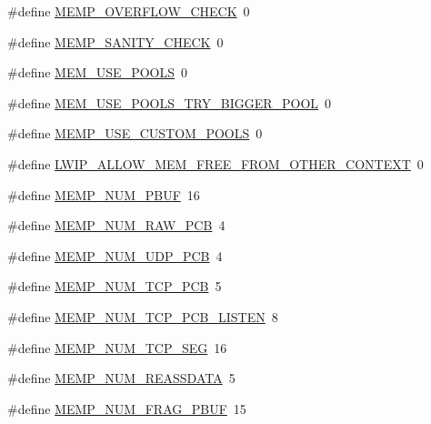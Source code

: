 \begin{DoxyCompactItemize}
\item 
\#define \hyperlink{group__lwip__opts__mem_ga27fdd01194a42fc41a7716b72cdb49e3}{M\+E\+M\+P\+\_\+\+O\+V\+E\+R\+F\+L\+O\+W\+\_\+\+C\+H\+E\+CK}~0
\item 
\#define \hyperlink{group__lwip__opts__mem_ga0838947193e222a9f46b582e01e5beff}{M\+E\+M\+P\+\_\+\+S\+A\+N\+I\+T\+Y\+\_\+\+C\+H\+E\+CK}~0
\item 
\#define \hyperlink{group__lwip__opts__mem_gaddca3141bc7037241769eb152b6f89ba}{M\+E\+M\+\_\+\+U\+S\+E\+\_\+\+P\+O\+O\+LS}~0
\item 
\#define \hyperlink{group__lwip__opts__mem_gaba8be68e8fd0716b723ce4569ed89f82}{M\+E\+M\+\_\+\+U\+S\+E\+\_\+\+P\+O\+O\+L\+S\+\_\+\+T\+R\+Y\+\_\+\+B\+I\+G\+G\+E\+R\+\_\+\+P\+O\+OL}~0
\item 
\#define \hyperlink{group__lwip__opts__mem_ga69de593b8ffd4f1c249f03e48e11983b}{M\+E\+M\+P\+\_\+\+U\+S\+E\+\_\+\+C\+U\+S\+T\+O\+M\+\_\+\+P\+O\+O\+LS}~0
\item 
\#define \hyperlink{group__lwip__opts__mem_ga0a3ef6098813c103e5aba07da76e15e2}{L\+W\+I\+P\+\_\+\+A\+L\+L\+O\+W\+\_\+\+M\+E\+M\+\_\+\+F\+R\+E\+E\+\_\+\+F\+R\+O\+M\+\_\+\+O\+T\+H\+E\+R\+\_\+\+C\+O\+N\+T\+E\+XT}~0
\item 
\#define \hyperlink{group__lwip__opts__memp_ga92b30aed958ec59334d936d4ca725418}{M\+E\+M\+P\+\_\+\+N\+U\+M\+\_\+\+P\+B\+UF}~16
\item 
\#define \hyperlink{group__lwip__opts__memp_ga379bf92ed322cda54cb701337421e0d3}{M\+E\+M\+P\+\_\+\+N\+U\+M\+\_\+\+R\+A\+W\+\_\+\+P\+CB}~4
\item 
\#define \hyperlink{group__lwip__opts__memp_ga2c416da481ab09bd1ba257b75a0707eb}{M\+E\+M\+P\+\_\+\+N\+U\+M\+\_\+\+U\+D\+P\+\_\+\+P\+CB}~4
\item 
\#define \hyperlink{group__lwip__opts__memp_ga73beecc19cfbc3114768f9b32b2cd70e}{M\+E\+M\+P\+\_\+\+N\+U\+M\+\_\+\+T\+C\+P\+\_\+\+P\+CB}~5
\item 
\#define \hyperlink{group__lwip__opts__memp_ga04fba6a249123513271dccb4ec26aa5a}{M\+E\+M\+P\+\_\+\+N\+U\+M\+\_\+\+T\+C\+P\+\_\+\+P\+C\+B\+\_\+\+L\+I\+S\+T\+EN}~8
\item 
\#define \hyperlink{group__lwip__opts__memp_gaa35fb3a1a76661e3ffb9722a57092de3}{M\+E\+M\+P\+\_\+\+N\+U\+M\+\_\+\+T\+C\+P\+\_\+\+S\+EG}~16
\item 
\#define \hyperlink{group__lwip__opts__memp_ga169436c5860253b90e25bdba9fdcac86}{M\+E\+M\+P\+\_\+\+N\+U\+M\+\_\+\+R\+E\+A\+S\+S\+D\+A\+TA}~5
\item 
\#define \hyperlink{group__lwip__opts__memp_ga1f66051a654dcd7a4e19bc6aff240630}{M\+E\+M\+P\+\_\+\+N\+U\+M\+\_\+\+F\+R\+A\+G\+\_\+\+P\+B\+UF}~15

\end{DoxyCompactItemize}
